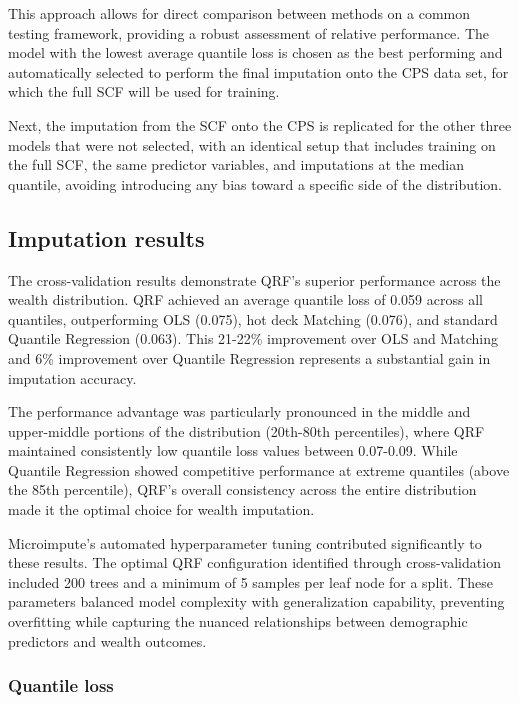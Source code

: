 This approach allows for direct comparison between methods on a common testing framework, providing a robust assessment of relative performance. The model with the lowest average quantile loss is chosen as the best performing and automatically selected to perform the final imputation onto the CPS data set, for which the full SCF will be used for training. 

Next, the imputation from the SCF onto the CPS is replicated for the other three models that were not selected, with an identical setup that includes training on the full SCF, the same predictor variables, and imputations at the median quantile, avoiding introducing any bias toward a specific side of the distribution. 

\subsection{Imputation results}

The cross-validation results demonstrate QRF's superior performance across the wealth distribution. QRF achieved an average quantile loss of 0.059 across all quantiles, outperforming OLS (0.075), hot deck Matching (0.076), and standard Quantile Regression (0.063). This 21-22\% improvement over OLS and Matching and 6\% improvement over Quantile Regression represents a substantial gain in imputation accuracy.

The performance advantage was particularly pronounced in the middle and upper-middle portions of the distribution (20th-80th percentiles), where QRF maintained consistently low quantile loss values between 0.07-0.09. While Quantile Regression showed competitive performance at extreme quantiles (above the 85th percentile), QRF's overall consistency across the entire distribution made it the optimal choice for wealth imputation.

Microimpute's automated hyperparameter tuning contributed significantly to these results. The optimal QRF configuration identified through cross-validation included 200 trees and a minimum of 5 samples per leaf node for a split. These parameters balanced model complexity with generalization capability, preventing overfitting while capturing the nuanced relationships between demographic predictors and wealth outcomes.

\subsubsection{Quantile loss}

